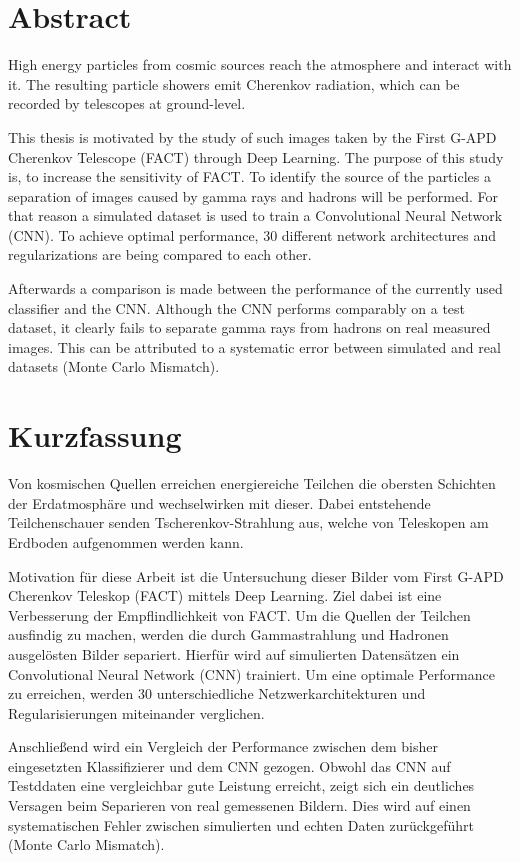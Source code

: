 \thispagestyle{plain}

\section*{Abstract}
High energy particles from cosmic sources reach the atmosphere and interact with it.
The resulting particle showers emit Cherenkov radiation, which can be recorded by telescopes at ground-level.

This thesis is motivated by the study of such images taken by the First G-APD Cherenkov Telescope (FACT) through Deep Learning.
The purpose of this study is, to increase the sensitivity of FACT.
To identify the source of the particles a separation of images caused by gamma rays and hadrons will be performed.
For that reason a simulated dataset is used to train a Convolutional Neural Network (CNN).
To achieve optimal performance, \num{30} different network architectures and regularizations are being compared to each other.

Afterwards a comparison is made between the performance of the currently used classifier and the CNN.
Although the CNN performs comparably on a test dataset, it clearly fails to separate gamma rays from hadrons on real measured images.
This can be attributed to a systematic error between simulated and real datasets (Monte Carlo Mismatch).

\section*{Kurzfassung}
Von kosmischen Quellen erreichen energiereiche Teilchen die obersten Schichten der Erdatmosphäre und wechselwirken mit dieser.
Dabei entstehende Teilchenschauer senden Tscherenkov-Strahlung aus, welche von Teleskopen am Erdboden aufgenommen werden kann.

Motivation für diese Arbeit ist die Untersuchung dieser Bilder vom First G-APD Cherenkov Teleskop (FACT) mittels Deep Learning.
Ziel dabei ist eine Verbesserung der Empflindlichkeit von FACT.
Um die Quellen der Teilchen ausfindig zu machen, werden die durch Gammastrahlung und Hadronen ausgelösten Bilder separiert.
Hierfür wird auf simulierten Datensätzen ein Convolutional Neural Network (CNN) trainiert.
Um eine optimale Performance zu erreichen,
werden \num{30} unterschiedliche Netzwerkarchitekturen und Regularisierungen miteinander verglichen.

Anschließend wird ein Vergleich der Performance zwischen dem bisher eingesetzten Klassifizierer und dem CNN gezogen.
Obwohl das CNN auf Testddaten eine vergleichbar gute Leistung erreicht,
zeigt sich ein deutliches Versagen beim Separieren von real gemessenen Bildern.
Dies wird auf einen systematischen Fehler zwischen simulierten und echten Daten zurückgeführt (Monte Carlo Mismatch).
